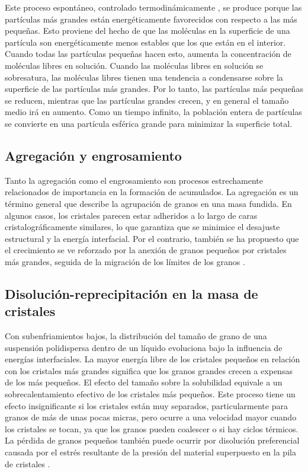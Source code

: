 \documentclass[3pt,twocolumn]{elsarticle}
\begin{document}
Este proceso espontáneo, controlado termodinámicamente \cite{a4}, se produce porque las partículas más grandes están energéticamente favorecidos con respecto a las más pequeñas. Esto proviene del hecho de que las moléculas en la superficie de una partícula son energéticamente menos estables que los que están en el interior. Cuando todas las partículas pequeñas hacen esto, aumenta la concentración de moléculas libres en solución. Cuando las moléculas libres en solución se sobresatura, las moléculas libres tienen una tendencia a condensarse sobre la superficie de las partículas más grandes. Por lo tanto, las partículas más pequeñas se reducen, mientras que las partículas grandes crecen, y en general el tamaño medio irá en aumento. Como un tiempo infinito, la población entera de partículas se convierte en una partícula esférica grande para minimizar la superficie total.

\subsection{Agregación y engrosamiento}
Tanto la agregación como el engrosamiento son procesos estrechamente relacionados de importancia en la formación de acumulados. La agregación es un término general que describe la agrupación de granos en una masa fundida. En algunos casos, los cristales parecen estar adheridos a lo largo de caras cristalográficamente similares, lo que garantiza que se minimice el desajuste estructural y la energía interfacial. Por el contrario, también se ha propuesto que el crecimiento se ve reforzado por la anexión de granos pequeños por cristales más grandes, seguida de la migración de los límites de los granos \cite{a9}.

\subsection{Disolución-reprecipitación en la masa de cristales}
Con subenfriamientos bajos, la distribución del tamaño de grano de una suspensión polidispersa dentro de un líquido evoluciona bajo la influencia de energías interfaciales. La mayor energía libre de los cristales pequeños en relación con los cristales más grandes significa que los granos grandes crecen a expensas de los más pequeños. El efecto del tamaño sobre la solubilidad equivale a un sobrecalentamiento efectivo de los cristales más pequeños. Este proceso tiene un efecto insignificante si los cristales están muy separados, particularmente para granos de más de unas pocas micras, pero ocurre a una velocidad mayor cuando los cristales se tocan, ya que los granos pueden coalescer o si hay ciclos térmicos. La pérdida de granos pequeños también puede ocurrir por disolución preferencial causada por el estrés resultante de la presión del material superpuesto en la pila de cristales \cite{a10}. 
\end{document}
